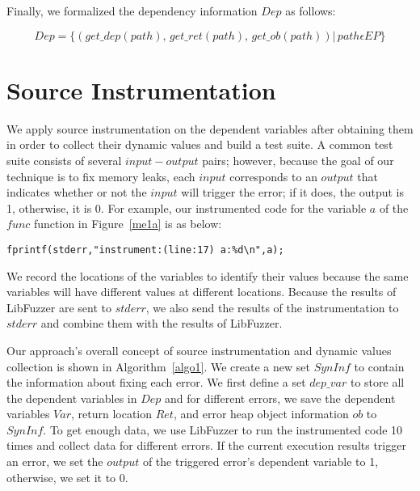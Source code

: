 \documentclass[a4paper,11pt,oneside,openany]{book}
\begin{document}
Finally, we formalized the dependency information $Dep$ as follows:

\begin{equation}
Dep=\{(get\_dep(path),\,get\_ret(path),\,get\_ob(path))|\, path \epsilon EP\}
\end{equation}

\section{Source Instrumentation}
We apply source instrumentation on the dependent variables after obtaining them in order to collect their dynamic values and build a test suite. A common test suite consists of several $input-output$ pairs; however, because the goal of our technique is to fix memory leaks, each $input$ corresponds to an $output$ that indicates whether or not the $input$ will trigger the error; if it does, the output is 1, otherwise, it is 0. For example, our instrumented code for the variable $a$ of the $func$ function in Figure~\ref{me1a} is as below:


\begin{minipage}{\textwidth}
\vspace{0.2cm}
\hspace{0.3cm}\verb|fprintf(stderr,"instrument:(line:17) a:%d\n",a);|
\vspace{0.2cm}
\end{minipage}
We record the locations of the variables to identify their values because the same variables will have different values at different locations. Because the results of LibFuzzer are sent to $stderr$, we also send the results of the instrumentation to $stderr$ and combine them with the results of LibFuzzer.


Our approach's overall concept of source instrumentation and dynamic values collection is shown in Algorithm~\ref{algo1}. We create a new set $SynInf$ to contain the information about fixing each error. We first define a set $dep\_var$ to store all the dependent variables in $Dep$ and for different errors, we save the dependent variables $Var$, return location $Ret$, and error heap object information $ob$ to $SynInf$. To get enough data, we use LibFuzzer to run the instrumented code 10 times and collect data for different errors. If the current execution results trigger an error, we set the $output$ of the triggered error's dependent variable to 1, otherwise, we set it to 0.
\end{document}

